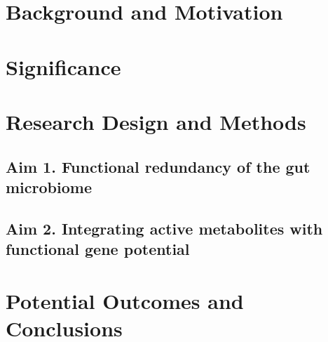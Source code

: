 \documentclass[11pt]{article}
\begin{document}
\section*{Background and Motivation} %

\section*{Significance} %

\section*{Research Design and Methods}

\subsection*{Aim 1. Functional redundancy of the gut microbiome}


\subsection*{Aim 2. Integrating active metabolites with functional gene potential}


\section*{Potential Outcomes and Conclusions}


\pagebreak

\section*{\refname}
\footnotesize{

\par}
\end{document}

